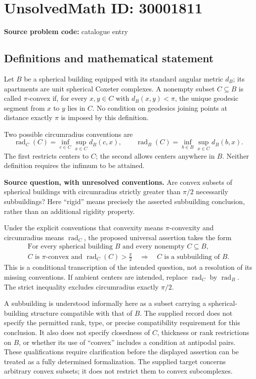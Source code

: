\documentclass[11pt]{article}
\begin{document}
\section*{UnsolvedMath ID: 30001811}
\textbf{Source problem code:} catalogue entry
\subsection{Definitions and mathematical statement}
Let \(B\) be a spherical building equipped with its standard angular metric \(d_B\); its apartments are unit spherical Coxeter complexes. A nonempty subset \(C\subseteq B\) is called \(\pi\)-convex if, for every \(x,y\in C\) with \(d_B(x,y)<\pi\), the unique geodesic segment from \(x\) to \(y\) lies in \(C\). No condition on geodesics joining points at distance exactly \(\pi\) is imposed by this definition.

Two possible circumradius conventions are
\[
\operatorname{rad}_{C}(C)=\inf_{c\in C}\sup_{x\in C}d_B(c,x),
\qquad
\operatorname{rad}_{B}(C)=\inf_{b\in B}\sup_{x\in C}d_B(b,x).
\]
The first restricts centers to \(C\); the second allows centers anywhere in \(B\). Neither definition requires the infimum to be attained.

\textbf{Source question, with unresolved conventions.} Are convex subsets of spherical buildings with circumradius strictly greater than \(\pi/2\) necessarily subbuildings? Here ``rigid'' means precisely the asserted subbuilding conclusion, rather than an additional rigidity property.

Under the explicit conventions that convexity means \(\pi\)-convexity and circumradius means \(\operatorname{rad}_{C}\), the proposed universal assertion takes the form
\[
\begin{gathered}
\text{For every spherical building }B\text{ and every nonempty }C\subseteq B,\\
C\text{ is }\pi\text{-convex and }\operatorname{rad}_{C}(C)>\frac{\pi}{2}
\quad\Longrightarrow\quad
C\text{ is a subbuilding of }B.
\end{gathered}
\]
This is a conditional transcription of the intended question, not a resolution of its missing conventions. If ambient centers are intended, replace \(\operatorname{rad}_{C}\) by \(\operatorname{rad}_{B}\). The strict inequality excludes circumradius exactly \(\pi/2\).

A subbuilding is understood informally here as a subset carrying a spherical-building structure compatible with that of \(B\). The supplied record does not specify the permitted rank, type, or precise compatibility requirement for this conclusion. It also does not specify closedness of \(C\), thickness or rank restrictions on \(B\), or whether its use of ``convex'' includes a condition at antipodal pairs. These qualifications require clarification before the displayed assertion can be treated as a fully determined formalization. The supplied target concerns arbitrary convex subsets; it does not restrict them to convex subcomplexes.
\end{document}
